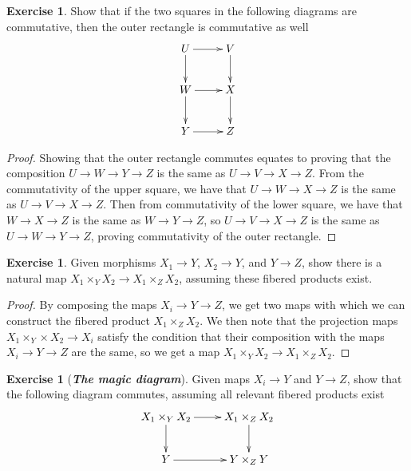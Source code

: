 \documentclass[psamsfonts]{amsart}
\theoremstyle{definition}
\newtheorem{exer}[thm]{Exercise}
\theoremstyle{remark}
\newcommand{\ib}[1]{\textbf{\textit{#1}}}
\begin{document}
%
\begin{exer}
Show that if the two squares in the following diagrams are commutative, then the outer rectangle is commutative as well
$$\xymatrix{
U \ar[d]\ar[r] & V \ar[d] \\
W \ar[d] \ar[r] & X \ar[d] \\
Y  \ar[r] & Z
}$$
\end{exer}
%
\begin{proof}
Showing that the outer rectangle commutes equates to proving that the composition $U \to W \to Y \to Z$ is the same as $U \to V \to X \to Z$. From the commutativity of the upper square, we have that $U \to W \to X \to Z$ is the same as $U \to V \to X \to Z$. Then from commutativity of the lower square, we have that $W \to X \to Z$ is the same as $W \to Y \to Z$, so $U \to V \to X \to Z$ is the same as $U \to W \to Y \to Z$, proving commutativity of the outer rectangle.
\end{proof}
%
\begin{exer}
Given morphisms $X_1 \to Y$, $X_2 \to Y$, and $Y \to Z$, show there is a natural map $X_1 \times_Y X_2 \to X_1 \times_Z X_2$, assuming these fibered products exist.
\end{exer}
%
\begin{proof}
By composing the maps $X_i \to Y \to Z$, we get two maps with which we can construct the fibered product $X _1\times_Z X_2$. We then note that the projection maps $X_1 \times_Y \times X_2 \to X_i$ satisfy the condition that their composition with the maps $X_i \to Y \to Z$ are the same, so we get a map $X_1 \times_Y X_2 \to X_1 \times_Z X_2$.
\end{proof}
\begin{exer}[\ib{The magic diagram}]
Given maps $X_i \to Y$ and $Y \to Z$, show that the following diagram commutes, assuming all relevant fibered products exist
$$\xymatrix{
X_1 \times_Y X_2 \ar[d] \ar[r] & X_1 \times_Z X_2 \ar[d] \\
Y \ar[r] & Y \times_Z Y
}$$
\end{exer}
%
\end{document}
